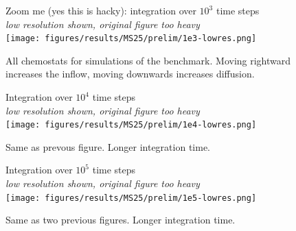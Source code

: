 \documentclass[11pt]{article}
\newcommand{\includeOrGrayBox}[1]{%
  \IfFileExists{#1}{%
    \texttt{[image: \#1]}%
  }{%
    \textcolor{lightgray}{\rule{0.09\textwidth}{0.09\textwidth}}
  }%
}
\begin{document}
\begin{figure}[h!]
  \centering
  {\Large Zoom me (yes this is hacky): integration over $10^3$ time steps}\\
  {\color{red}\Large \textit{low resolution shown, original figure too heavy}}\\
  \texttt{[image: figures/results/MS25/prelim/1e3-lowres.png]}
  \caption{All chemostats for simulations of the benchmark. Moving rightward increases the inflow, moving downwards increases diffusion.}
  \label{fig:MS25a}
\end{figure}

\clearpage

\begin{figure}[h!]
  \centering
  {\Large Integration over $10^4$ time steps}\\
  {\color{red}\Large \textit{low resolution shown, original figure too heavy}}\\
  \vspace{1em}
  \texttt{[image: figures/results/MS25/prelim/1e4-lowres.png]}
  \caption{Same as prevous figure. Longer integration time.}
  \label{fig:MS25b}
\end{figure}

\clearpage

\begin{figure}[h!]
  \centering
  {\Large Integration over $10^5$ time steps}\\
  {\color{red}\Large \textit{low resolution shown, original figure too heavy}}\\
  \vspace{1em}
  \texttt{[image: figures/results/MS25/prelim/1e5-lowres.png]}
  \caption{Same as two previous figures. Longer integration time.}
  \label{fig:MS25c}
\end{figure}
\end{document}
